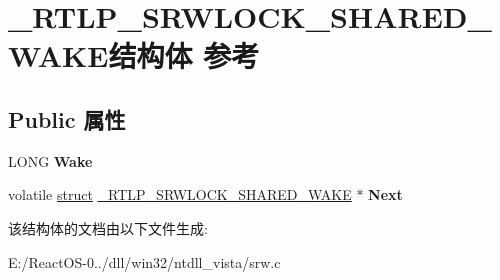 \hypertarget{struct___r_t_l_p___s_r_w_l_o_c_k___s_h_a_r_e_d___w_a_k_e}{}\section{\+\_\+\+R\+T\+L\+P\+\_\+\+S\+R\+W\+L\+O\+C\+K\+\_\+\+S\+H\+A\+R\+E\+D\+\_\+\+W\+A\+K\+E结构体 参考}
\label{struct___r_t_l_p___s_r_w_l_o_c_k___s_h_a_r_e_d___w_a_k_e}
\subsection*{Public 属性}
\begin{DoxyCompactItemize}
\item 
\mbox{\label{struct___r_t_l_p___s_r_w_l_o_c_k___s_h_a_r_e_d___w_a_k_e_ac369fb1c5697e7232ae23a1d0bc979d6}} 
L\+O\+NG {\bfseries Wake}
\item 
\mbox{\label{struct___r_t_l_p___s_r_w_l_o_c_k___s_h_a_r_e_d___w_a_k_e_a4195dbd23900e3eb058f6d8e31c70177}} 
volatile \hyperlink{interfacestruct}{struct} \hyperlink{struct___r_t_l_p___s_r_w_l_o_c_k___s_h_a_r_e_d___w_a_k_e}{\+\_\+\+R\+T\+L\+P\+\_\+\+S\+R\+W\+L\+O\+C\+K\+\_\+\+S\+H\+A\+R\+E\+D\+\_\+\+W\+A\+KE} $\ast$ {\bfseries Next}
\end{DoxyCompactItemize}


该结构体的文档由以下文件生成\+:\begin{DoxyCompactItemize}
\item 
E\+:/\+React\+O\+S-\/0../dll/win32/ntdll\+\_\+vista/srw.\+c\end{DoxyCompactItemize}
